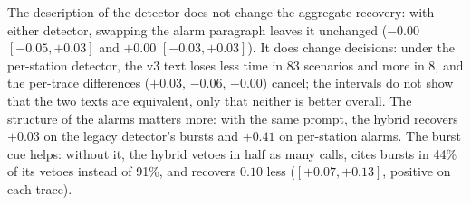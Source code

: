\documentclass[preprint,11pt]{elsarticle}
\begin{document}
\begin{table}[t]
\centering
\caption{Ablations of the hybrid planner on Claude Fable 5.1, held-out traces, 24-h net recovery with 95\% bootstrap interval stratified by trace. Alarm text: the paragraph of the prompt that describes the detector (v2: legacy; v3: per-station). Burst cue: the hybrid prompt's mention of ``a burst of alarms shared by many stations at once'' among the reasons to doubt the test. First row: the configuration of Tables~\ref{tab:heldout}--\ref{tab:stats}.}
\label{tab:ablation}
\small
{}
\end{table}

The description of the detector does not change the aggregate recovery: with either detector, swapping the alarm paragraph leaves it unchanged ($-0.00$ $[-0.05, +0.03]$ and $+0.00$ $[-0.03, +0.03]$). It does change decisions: under the per-station detector, the v3 text loses less time in 83 scenarios and more in 8, and the per-trace differences ($+0.03$, $-0.06$, $-0.00$) cancel; the intervals do not show that the two texts are equivalent, only that neither is better overall. The structure of the alarms matters more: with the same prompt, the hybrid recovers $+0.03$ on the legacy detector's bursts and $+0.41$ on per-station alarms. The burst cue helps: without it, the hybrid vetoes in half as many calls, cites bursts in 44\% of its vetoes instead of 91\%, and recovers $0.10$ less ($[+0.07, +0.13]$, positive on each trace).
\end{document}
